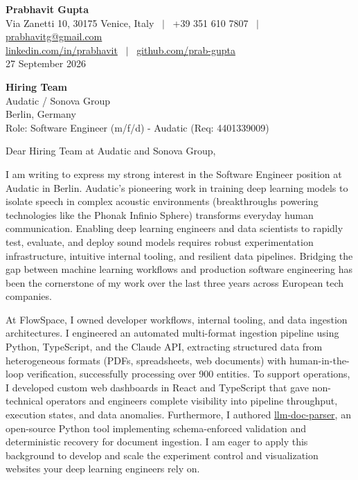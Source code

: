 \documentclass[11pt,a4paper]{article}
\begin{document}
\textbf{\large Prabhavit Gupta}\\
Via Zanetti 10, 30175 Venice, Italy ~$\vert$~ +39 351 610 7807 ~$\vert$~ \href{mailto:prabhavitg@gmail.com}{prabhavitg@gmail.com}\\
\href{https://www.linkedin.com/in/prabhavit/}{linkedin.com/in/prabhavit} ~$\vert$~ \href{https://github.com/prab-gupta}{github.com/prab-gupta}\\
27 September 2026

\textbf{Hiring Team}\\
Audatic / Sonova Group\\
Berlin, Germany\\
Role: Software Engineer (m/f/d) - Audatic (Req: 4401339009)

Dear Hiring Team at Audatic and Sonova Group,

I am writing to express my strong interest in the Software Engineer position at Audatic in Berlin. Audatic's pioneering work in training deep learning models to isolate speech in complex acoustic environments (breakthroughs powering technologies like the Phonak Infinio Sphere) transforms everyday human communication. Enabling deep learning engineers and data scientists to rapidly test, evaluate, and deploy sound models requires robust experimentation infrastructure, intuitive internal tooling, and resilient data pipelines. Bridging the gap between machine learning workflows and production software engineering has been the cornerstone of my work over the last three years across European tech companies.

At FlowSpace, I owned developer workflows, internal tooling, and data ingestion architectures. I engineered an automated multi-format ingestion pipeline using Python, TypeScript, and the Claude API, extracting structured data from heterogeneous formats (PDFs, spreadsheets, web documents) with human-in-the-loop verification, successfully processing over 900 entities. To support operations, I developed custom web dashboards in React and TypeScript that gave non-technical operators and engineers complete visibility into pipeline throughput, execution states, and data anomalies. Furthermore, I authored \href{https://github.com/prab-gupta/llm-doc-parser}{llm-doc-parser}, an open-source Python tool implementing schema-enforced validation and deterministic recovery for document ingestion. I am eager to apply this background to develop and scale the experiment control and visualization websites your deep learning engineers rely on.
\end{document}
